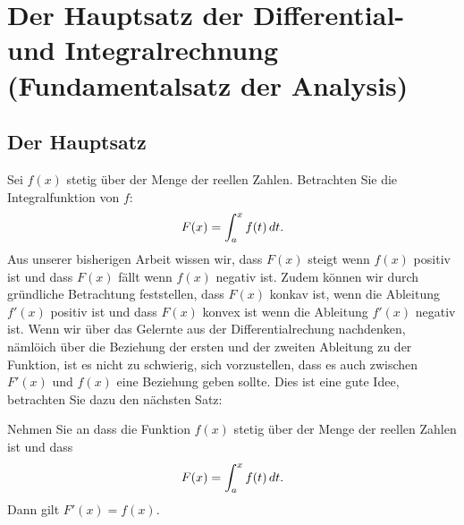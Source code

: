 \chapter{Der Hauptsatz der Differential- und Integralrechnung \newline (Fundamentalsatz der Analysis)}

\section{Der Hauptsatz}

Sei $f(x)$ stetig über der Menge der reellen Zahlen. Betrachten Sie die Integralfunktion von $f$:
\[
  F(x) = \int_a^x f(t)\, d t.
\]
Aus unserer bisherigen Arbeit wissen wir, dass $F(x)$ steigt wenn $f(x)$ positiv ist und dass $F(x)$ fällt wenn $f(x)$ negativ ist. Zudem können wir durch gründliche Betrachtung feststellen, dass $F(x)$ konkav ist, wenn die Ableitung $f'(x)$ positiv ist und dass $F(x)$ konvex ist wenn die Ableitung $f'(x)$ negativ ist. Wenn wir über das Gelernte aus der Differentialrechung nachdenken, nämlöich über die Beziehung der ersten und der zweiten Ableitung zu der Funktion, ist es nicht zu schwierig, sich vorzustellen, dass es auch zwischen $F'(x)$ und $f(x)$ eine Beziehung geben sollte. Dies ist eine gute Idee, betrachten Sie dazu den nächsten Satz:


\begin{mainTheorem}
\label{thm:fundamental_theorem_I}\hfil

\noindent Nehmen Sie an dass die Funktion $f(x)$ stetig über der Menge der reellen Zahlen ist und dass
\[
  F(x)=\int_a^x f(t)\, d t.
\]
Dann gilt $F'(x)=f(x)$.
\end{mainTheorem}

